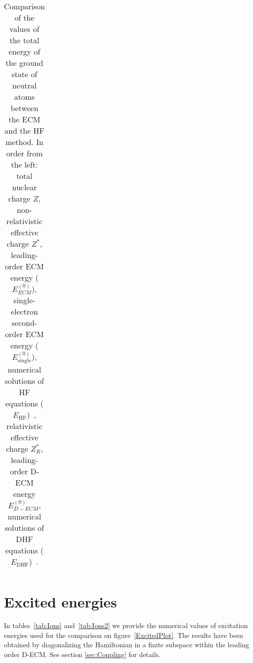 \begin{table}[]
\begin{tabular}{c|cccc|ccc}
    \hline
     \end{tabular}
     \caption{Comparison of the values of the total energy of the ground state of neutral atoms between the ECM and the HF method. In order from the left: total nuclear charge $Z$, non-relativistic effective charge $Z^{*}$, leading-order ECM energy ($E^{(0)}_{ECM}$), single-electron second-order ECM energy ($E_{\mathrm{single}}^{(0)}$), numerical solutions of HF equations ($E_{\mathrm{HF}}$)~\cite{Saito2009836}, relativistic effective charge $Z^{*}_R$, leading-order D-ECM energy $E^{(0)}_{D-ECM}$, numerical solutions of DHF equations ($E_{\mathrm{DHF}}$)~\cite{DESCLAUX1973311}.}\label{tab:ground_state_energies}
 \end{table} 
     
 \newpage
 
\section{Excited energies}
\label{app:HCI}

In tables~\ref{tab:Ions} and~\ref{tab:Ions2} we provide the numerical values of excitation energies used for the comparison on figure~\ref{ExcitedPlot}. The results have been obtained by diagonalizing the Hamiltonian in a finite subspace within the leading order D-ECM. See section \ref{sec:Coupling} for details.

\vspace{2cm}

